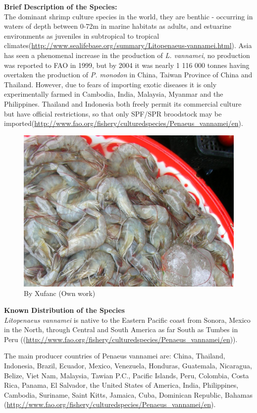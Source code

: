 \documentclass[]{book}
\theoremstyle{definition}
\theoremstyle{definition}
\theoremstyle{definition}
\theoremstyle{remark}
\begin{document}
\textbf{Brief Description of the Species:}\\
The dominant shrimp culture species in the world, they are benthic -
occurring in waters of depth between 0-72m in marine habitats as adults,
and estuarine environments as juveniles in subtropical to tropical
climates(\url{http://www.sealifebase.org/summary/Litopenaeus-vannamei.html}).
Asia has seen a phenomenal increase in the production of \emph{L.
vannamei}, no production was reported to FAO in 1999, but by 2004 it was
nearly 1 116 000 tonnes having overtaken the production of \emph{P.
monodon} in China, Taiwan Province of China and Thailand. However, due
to fears of importing exotic diseases it is only experimentally farmed
in Cambodia, India, Malaysia, Myanmar and the Philippines. Thailand and
Indonesia both freely permit its commercial culture but have official
restrictions, so that only SPF/SPR broodstock may be
imported(\url{http://www.fao.org/fishery/culturedspecies/Penaeus_vannamei/en}).

\begin{figure}
\centering
\includegraphics{images_species/Litopenaeus_vannamei55.jpg}
\caption{By Xufanc (Own work)}
\end{figure}

\textbf{Known Distribution of the Species}\\
\emph{Litopenaeus vannamei} is native to the Eastern Pacific coast from
Sonora, Mexico in the North, through Central and South America as far
South as Tumbes in Peru
((\url{http://www.fao.org/fishery/culturedspecies/Penaeus_vannamei/en})).

The main producer countries of Penaeus vannamei are: China, Thailand,
Indonesia, Brazil, Ecuador, Mexico, Venezuela, Honduras, Guatemala,
Nicaragua, Belize, Viet Nam, Malaysia, Tawian P.C., Pacific Islands,
Peru, Colombia, Costa Rica, Panama, El Salvador, the United States of
America, India, Philippines, Cambodia, Suriname, Saint Kitts, Jamaica,
Cuba, Dominican Republic, Bahamas
(\url{http://www.fao.org/fishery/culturedspecies/Penaeus_vannamei/en}).
\end{document}
